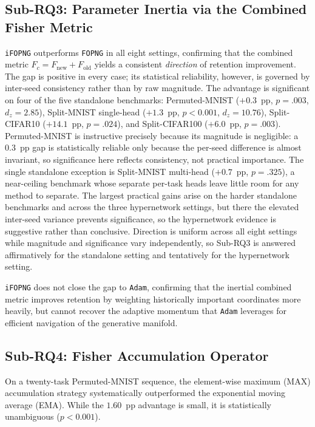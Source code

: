 \subsection{Sub-RQ3: Parameter Inertia via the Combined Fisher Metric}

\texttt{iFOPNG} outperforms \texttt{FOPNG} in all eight settings, confirming
that the combined metric $F_c = F_\mathrm{new} + F_\mathrm{old}$ yields a
consistent \emph{direction} of retention improvement.
The gap is positive in every case; its statistical reliability, however, is
governed by inter-seed consistency rather than by raw magnitude.
The advantage is significant on four of the five standalone benchmarks:
Permuted-MNIST ($+0.3$~pp, $p = .003$, $d_z = 2.85$), Split-MNIST single-head
($+1.3$~pp, $p < 0.001$, $d_z = 10.76$), Split-CIFAR10 ($+14.1$~pp, $p = .024$),
and Split-CIFAR100 ($+6.0$~pp, $p = .003$).
Permuted-MNIST is instructive precisely because its magnitude is negligible:
a $0.3$~pp gap is statistically reliable only because the per-seed difference is
almost invariant, so significance here reflects consistency, not practical
importance.
The single standalone exception is Split-MNIST multi-head ($+0.7$~pp,
$p = .325$), a near-ceiling benchmark whose separate per-task heads leave little
room for any method to separate.
The largest practical gains arise on the harder standalone benchmarks and across
the three hypernetwork settings, but there the elevated inter-seed variance
prevents significance, so the hypernetwork evidence is suggestive rather than
conclusive.
Direction is uniform across all eight settings while magnitude and significance
vary independently, so Sub-RQ3 is answered affirmatively for the standalone
setting and tentatively for the hypernetwork setting.

\texttt{iFOPNG} does not close the gap to \texttt{Adam}, confirming that the
inertial combined metric improves retention by weighting historically important
coordinates more heavily, but cannot recover the adaptive momentum that
\texttt{Adam} leverages for efficient navigation of the generative manifold.

\subsection{Sub-RQ4: Fisher Accumulation Operator}

On a twenty-task Permuted-MNIST sequence, the
element-wise maximum (MAX) accumulation strategy
systematically outperformed the exponential
moving average (EMA).
While the $1.60$~pp advantage is small,
it is statistically unambiguous ($p < 0.001$).

